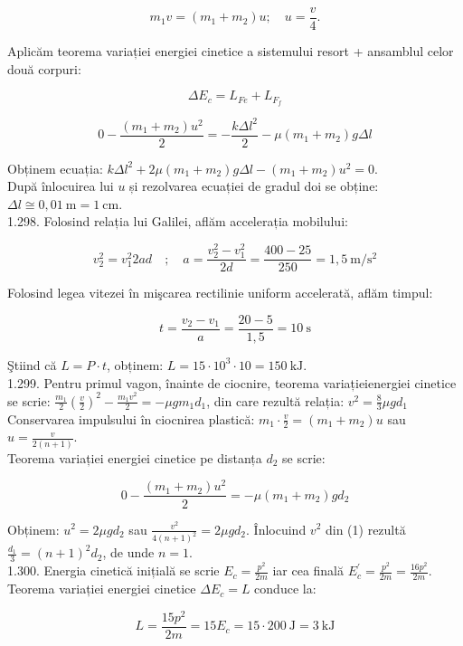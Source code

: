 $$
m_{1} v=\left(m_{1}+m_{2}\right) u ; \quad u=\frac{v}{4} .
$$

Aplicăm teorema variației energiei cinetice a sistemului resort + ansamblul celor două corpuri:

$$
\Delta E_{c}=L_{F e}+L_{F_{f}}
$$

$$
0-\frac{\left(m_{1}+m_{2}\right) u^{2}}{2}=-\frac{k \Delta l^{2}}{2}-\mu\left(m_{1}+m_{2}\right) g \Delta l
$$

Obținem ecuația: $k \Delta l^{2}+2 \mu\left(m_{1}+m_{2}\right) g \Delta l-\left(m_{1}+m_{2}\right) u^{2}=0$.\\
După înlocuirea lui $u$ și rezolvarea ecuației de gradul doi se obține: $\Delta l \cong 0,01 \mathrm{~m}=1 \mathrm{~cm}$.\\
1.298. Folosind relația lui Galilei, aflăm accelerația mobilului:

$$
v_{2}^{2}=v_{1}^{2} 2 a d \quad ; \quad a=\frac{v_{2}^{2}-v_{1}^{2}}{2 d}=\frac{400-25}{250}=1,5 \mathrm{~m} / \mathrm{s}^{2}
$$

Folosind legea vitezei în mişcarea rectilinie uniform accelerată, aflăm timpul:

$$
t=\frac{v_{2}-v_{1}}{a}=\frac{20-5}{1,5}=10 \mathrm{~s}
$$

Ştiind că $L=P \cdot t$, obținem: $L=15 \cdot 10^{3} \cdot 10=150 \mathrm{~kJ}$.\\
1.299. Pentru primul vagon, înainte de ciocnire, teorema variațieienergiei cinetice se scrie: $\frac{m_{1}}{2}\left(\frac{v}{2}\right)^{2}-\frac{m_{1} v^{2}}{2}=-\mu g m_{1} d_{1}$, din care rezultă relația: $v^{2}=\frac{8}{3} \mu g d_{1}$\\
Conservarea impulsului în ciocnirea plastică: $m_{1} \cdot \frac{v}{2}=\left(m_{1}+m_{2}\right) u$ sau $u=\frac{v}{2(n+1)}$.\\
Teorema variației energiei cinetice pe distanța $d_{2}$ se scrie:

$$
0-\frac{\left(m_{1}+m_{2}\right) u^{2}}{2}=-\mu\left(m_{1}+m_{2}\right) g d_{2}
$$

Obținem: $u^{2}=2 \mu g d_{2}$ sau $\frac{v^{2}}{4(n+1)^{2}}=2 \mu g d_{2}$. Înlocuind $v^{2}$ din (1) rezultă $\frac{d_{1}}{3}=(n+1)^{2} d_{2}$, de unde $n=1$.\\
1.300. Energia cinetică inițială se scrie $E_{c}=\frac{p^{2}}{2 m}$ iar cea finală $E_{c}^{\prime}=\frac{p^{2}}{2 m}=\frac{16 p^{2}}{2 m}$. Teorema variației energiei cinetice $\Delta E_{c}=L$ conduce la:

$$
L=\frac{15 p^{2}}{2 m}=15 E_{c}=15 \cdot 200 \mathrm{~J}=3 \mathrm{~kJ}
$$

